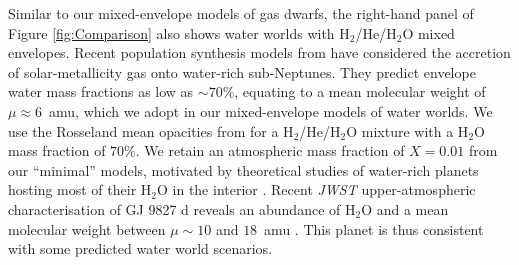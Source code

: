 \documentclass[fleqn,usenatbib]{mnras}
\begin{document}
Similar to our mixed-envelope models of gas dwarfs, the right-hand panel of Figure \ref{fig:Comparison} also shows water worlds with H$_2$/He/H$_2$O mixed envelopes. Recent population synthesis models from \citet{Burn2024, Burn2024b} have considered the accretion of solar-metallicity gas onto water-rich sub-Neptunes. They predict envelope water mass fractions as low as $\sim 70\%$, equating to a mean molecular weight of $\mu \approx 6$~amu, which we adopt in our mixed-envelope models of water worlds. We use the Rosseland mean opacities from \citet{Kempton2023} for a H$_2$/He/H$_2$O mixture with a H$_2$O mass fraction of $70\%$. We retain an atmospheric mass fraction of $X = 0.01$ from our ``minimal'' models, motivated by theoretical studies of water-rich planets hosting most of their H$_2$O in the interior \citep{Luo2024}. Recent \textit{JWST} upper-atmospheric characterisation of GJ 9827 d reveals an abundance of H$_2$O and a mean molecular weight between $\mu \sim 10$ and $18$~amu \citep{Piaulet-Ghorayeb2024}. This planet is thus consistent with some predicted water world scenarios.

\end{document}
